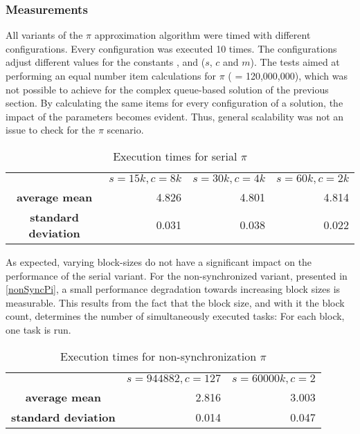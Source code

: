 \subsubsection{Measurements}
All variants of the $\pi$ approximation algorithm were timed with different configurations. Every configuration was executed 10 times. The configurations adjust different values for the constants ,  and  ($s$, $c$ and $m$). The tests aimed at performing an equal number item calculations for $\pi$ (  = 120,000,000), which was not possible to achieve for the complex queue-based solution of the previous section. By calculating the same items for every configuration of a solution, the impact of the parameters becomes evident. Thus, general scalability was not an issue to check for the $\pi$ scenario.

\begin{table}[h!]
\begin{center}
\begin{tabular}{ c| r|r|r|}
\cline{2-4}  & $s = 15k, c = 8k$ & $s = 30k, c = 4k$ & $s = 60k, c = 2k$\\ 
\cline{2-4} \textbf{average mean} & 4.826 & 4.801 & 4.814 \\ 
\cline{2-4} \textbf{standard deviation} & 0.031 & 0.038 & 0.022 \\ 
\cline{2-4}
\end{tabular} 
\caption{Execution times for serial $\pi$}
\label{table:serial_pi}
\end{center}
\end{table}

As expected, varying block-sizes do not have a significant impact on the performance of the serial variant. For the non-synchronized variant, presented in \ref{nonSyncPi}, a small performance degradation towards increasing block sizes is measurable. This results from the fact that the block size, and with it the block count, determines the number of simultaneously executed tasks: For each block, one task is run.

\begin{table}[h!]
\begin{center}
\begin{tabular}{ c| r|r|}
\cline{2-3}  & $s = 944882, c = 127$ & $s = 60000k, c = 2$\\ 
\cline{2-3} \textbf{average mean} & 2.816 & 3.003\\ 
\cline{2-3} \textbf{standard deviation} & 0.014 & 0.047 \\ 
\cline{2-3}
\end{tabular} 
\caption{Execution times for non-synchronization $\pi$}
\label{table:nonsync_pi}
\end{center}
\end{table}

